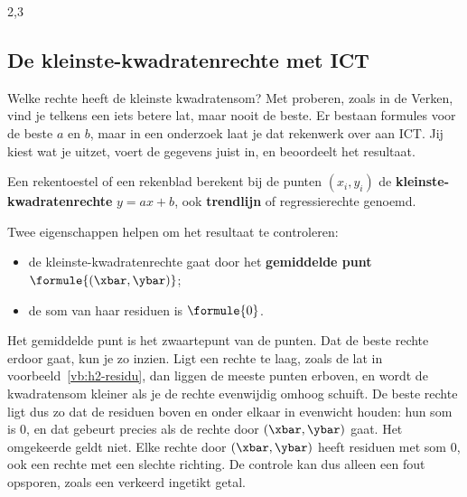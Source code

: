 \begin{alleenvoor}{2,3}
\subsection{De kleinste-kwadratenrechte met ICT}

Welke rechte heeft de kleinste kwadratensom? Met proberen, zoals in de Verken, vind je telkens een iets betere lat, maar nooit de beste. Er bestaan formules voor de beste $a$ en $b$, maar in een onderzoek laat je dat rekenwerk over aan ICT. Jij kiest wat je uitzet, voert de gegevens juist in, en beoordeelt het resultaat.


\begin{theorie}
Een rekentoestel of een rekenblad berekent bij de punten $(x_i, y_i)$ de \textbf{\textcolor{accent}{kleinste-kwadratenrechte}} $y = ax + b$, ook \textbf{\textcolor{accent}{trendlijn}} of regressierechte genoemd.

\vspace{1mm}
Twee eigenschappen helpen om het resultaat te controleren:
\begin{itemize}
\item de kleinste-kwadratenrechte gaat door het \textbf{\textcolor{accent}{gemiddelde punt}} $\formule{(\xbar, \ybar)}$;
\item de som van haar residuen is $\formule{0}$.
\end{itemize}
\end{theorie}

Het gemiddelde punt is het zwaartepunt van de punten. Dat de beste rechte erdoor gaat, kun je zo inzien. Ligt een rechte te laag, zoals de lat in voorbeeld~\ref{vb:h2-residu}, dan liggen de meeste punten erboven, en wordt de kwadratensom kleiner als je de rechte evenwijdig omhoog schuift. De beste rechte ligt dus zo dat de residuen boven en onder elkaar in evenwicht houden: hun som is $0$, en dat gebeurt precies als de rechte door $(\xbar, \ybar)$ gaat. Het omgekeerde geldt niet. Elke rechte door $(\xbar, \ybar)$ heeft residuen met som $0$, ook een rechte met een slechte richting. De controle kan dus alleen een fout opsporen, zoals een verkeerd ingetikt getal.


\end{alleenvoor}
